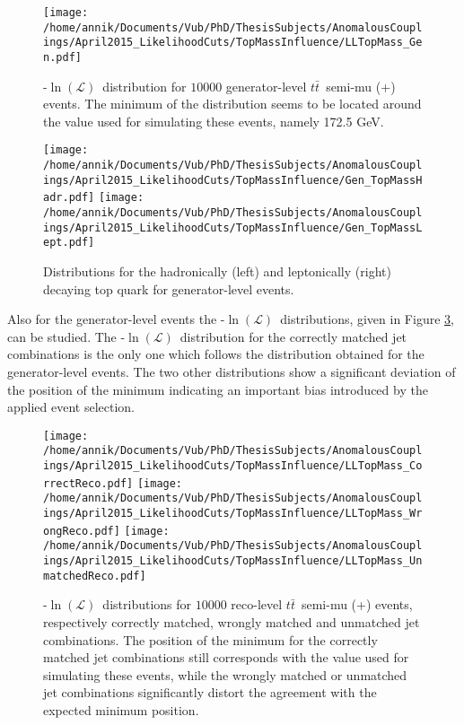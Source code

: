 \documentclass[a4paper,10pt]{article}
\newcommand{\NegLL}{-$\ln(\mathcal{L})$~}
\newcommand{\ttbar}{$t\bar{t}$~}
\begin{document}
\begin{figure}[h!t]
 \centering
 \texttt{[image: /home/annik/Documents/Vub/PhD/ThesisSubjects/AnomalousCouplings/April2015\_LikelihoodCuts/TopMassInfluence/LLTopMass\_Gen.pdf]}
 \caption{\NegLL distribution for $10 000$ generator-level \ttbar semi-mu (+) events. The minimum of the distribution seems to be located around the value used for simulating these events, namely 172.5 GeV.}
 \label{fig::MTGenLL}
\end{figure}

\begin{figure}[h!t]
 \centering
 \texttt{[image: /home/annik/Documents/Vub/PhD/ThesisSubjects/AnomalousCouplings/April2015\_LikelihoodCuts/TopMassInfluence/Gen\_TopMassHadr.pdf]}
 \texttt{[image: /home/annik/Documents/Vub/PhD/ThesisSubjects/AnomalousCouplings/April2015\_LikelihoodCuts/TopMassInfluence/Gen\_TopMassLept.pdf]}
 \caption{Distributions for the hadronically (left) and leptonically (right) decaying top quark for generator-level events.}\label{fig::MTGenDistr}
\end{figure}

Also for the generator-level events the \NegLL distributions, given in Figure \ref{fig::MTRecoLL}, can be studied.
The \NegLL distribution for the correctly matched jet combinations is the only one which follows the distribution obtained for the generator-level events. The two other distributions show a significant deviation of the position of the minimum indicating an important bias introduced by the applied event selection.\\
\begin{figure}[h!t]
 \centering
 \texttt{[image: /home/annik/Documents/Vub/PhD/ThesisSubjects/AnomalousCouplings/April2015\_LikelihoodCuts/TopMassInfluence/LLTopMass\_CorrectReco.pdf]}
 \texttt{[image: /home/annik/Documents/Vub/PhD/ThesisSubjects/AnomalousCouplings/April2015\_LikelihoodCuts/TopMassInfluence/LLTopMass\_WrongReco.pdf]}
 \texttt{[image: /home/annik/Documents/Vub/PhD/ThesisSubjects/AnomalousCouplings/April2015\_LikelihoodCuts/TopMassInfluence/LLTopMass\_UnmatchedReco.pdf]}
 \caption{\NegLL distributions for $10000$ reco-level \ttbar semi-mu (+) events, respectively correctly matched, wrongly matched and unmatched jet combinations. The position of the minimum for the correctly matched jet combinations still corresponds with the value used for simulating these events, while the wrongly matched or unmatched jet combinations significantly distort the agreement with the expected minimum position.}
 \label{fig::MTRecoLL}
\end{figure}
\end{document}
